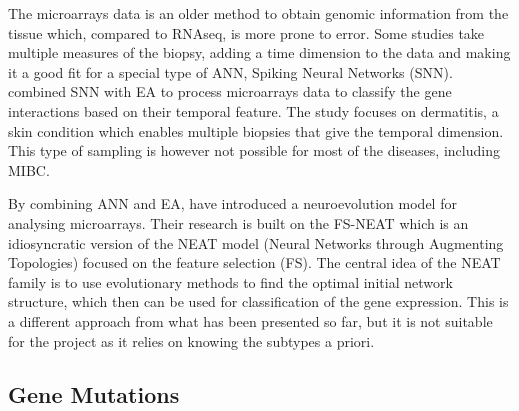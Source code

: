 The microarrays data is an older method to obtain genomic information from the tissue which, compared to RNAseq, is more prone to error. Some studies take multiple measures of the biopsy, adding a time dimension to the data and making it a good fit for a special type of ANN, Spiking Neural Networks (SNN). \citet{Capecci2020-uj} combined SNN with EA to process microarrays data to classify the gene interactions based on their temporal feature. The study focuses on dermatitis, a skin condition which enables multiple biopsies that give the temporal dimension. This type of sampling is however not possible for most of the diseases, including MIBC.

By combining ANN and EA, \citet{Grisci2019-xn} have introduced a neuroevolution model for analysing microarrays. Their research is built on the FS-NEAT\cite{Whiteson2005-dn} which is an idiosyncratic version of the NEAT model (Neural Networks through Augmenting Topologies)\cite{Stanley2002-tg} focused on the feature selection (FS). The central idea of the NEAT family is to use evolutionary methods to find the optimal initial network structure, which then can be used for classification of the gene expression. This is a different approach from what has been presented so far, but it is not suitable for the project as it relies on knowing the subtypes a priori.

\subsection{Gene Mutations} \label{s:lit:mutations}

\vspace{3mm}
\vspace{3mm}


